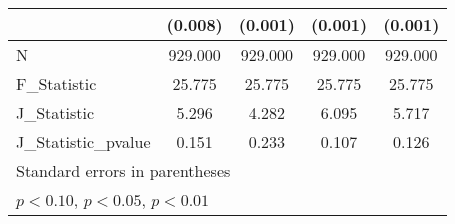 {\begin{tabular}{l*{4}{c}}
            &     (0.008)         &     (0.001)         &     (0.001)         &     (0.001)         \\
\hline
N           &     929.000         &     929.000         &     929.000         &     929.000         \\
F\_Statistic &      25.775         &      25.775         &      25.775         &      25.775         \\
J\_Statistic &       5.296         &       4.282         &       6.095         &       5.717         \\
J\_Statistic\_pvalue&       0.151         &       0.233         &       0.107         &       0.126         \\
\hline\hline
\multicolumn{5}{l}{\footnotesize Standard errors in parentheses}\\
\multicolumn{5}{l}{\footnotesize \sym{*} \(p<0.10\), \sym{**} \(p<0.05\), \sym{***} \(p<0.01\)}\\
\end{tabular}
}
